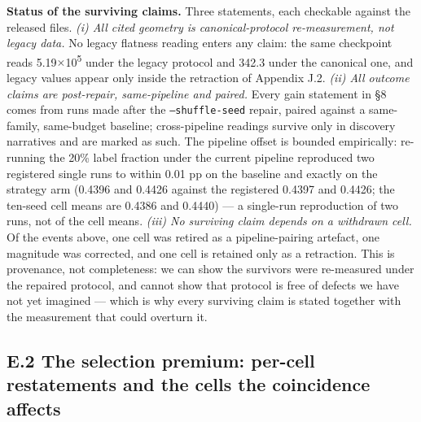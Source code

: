 \documentclass[pdflatex,sn-mathphys-ay]{sn-jnl}
\begin{document}
\textbf{Status of the surviving claims.} Three statements, each checkable against the released files. \emph{(i) All cited geometry is canonical-protocol re-measurement, not legacy data.} No legacy flatness reading enters any claim: the same checkpoint reads 5.19\ensuremath{\times}10\textsuperscript{5} under the legacy protocol and 342.3 under the canonical one, and legacy values appear only inside the retraction of Appendix J.2. \emph{(ii) All outcome claims are post-repair, same-pipeline and paired.} Every gain statement in \S{}8 comes from runs made after the \texttt{--shuffle-seed} repair, paired against a same-family, same-budget baseline; cross-pipeline readings survive only in discovery narratives and are marked as such. The pipeline offset is bounded empirically: re-running the 20\% label fraction under the current pipeline reproduced two registered single runs to within 0.01 pp on the baseline and exactly on the strategy arm (0.4396 and 0.4426 against the registered 0.4397 and 0.4426; the ten-seed cell means are 0.4386 and 0.4440) --- a single-run reproduction of two runs, not of the cell means. \emph{(iii) No surviving claim depends on a withdrawn cell.} Of the events above, one cell was retired as a pipeline-pairing artefact, one magnitude was corrected, and one cell is retained only as a retraction. This is provenance, not completeness: we can show the survivors were re-measured under the repaired protocol, and cannot show that protocol is free of defects we have not yet imagined --- which is why every surviving claim is stated together with the measurement that could overturn it.

\subsection*{E.2 The selection premium: per-cell restatements and the cells the coincidence affects}
\end{document}
